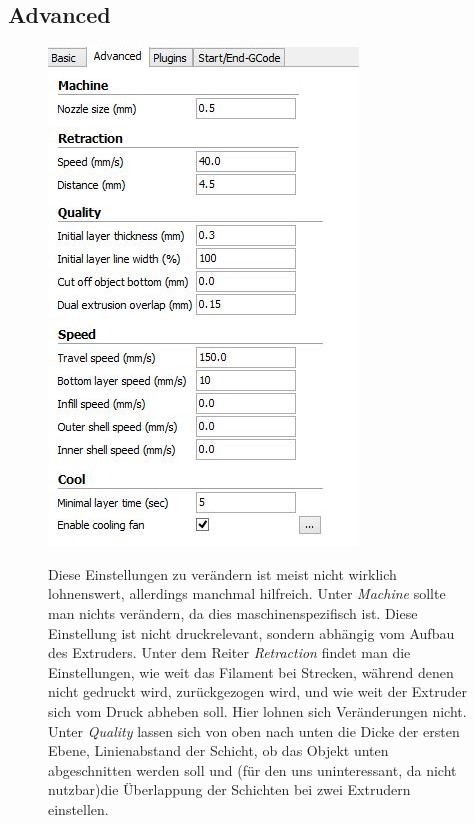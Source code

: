 \documentclass[11pt,a4paper]{scrartcl}
\begin{document}
\subsection{Advanced}
\begin{figure}[ht]
\begin{minipage}{.55\textwidth}
\begin{center}
 \includegraphics[scale=0.7]{res/CuraSettingAdvanced.JPG}
 \end{center}
\end{minipage}
\begin{minipage}{.47\textwidth}
Diese Einstellungen zu verändern ist meist nicht wirklich lohnenswert, allerdings manchmal hilfreich. Unter \textit{Machine} sollte man nichts verändern, da dies maschinenspezifisch ist. Diese Einstellung ist nicht druckrelevant, sondern abhängig vom Aufbau des Extruders. Unter dem Reiter \textit{Retraction} findet man die Einstellungen, wie weit das Filament bei Strecken, während denen nicht gedruckt wird, zurückgezogen wird, und wie weit der Extruder sich vom Druck abheben soll. Hier lohnen sich Veränderungen nicht.\\
Unter \textit{Quality} lassen sich von oben nach unten die Dicke der ersten Ebene, Linienabstand der Schicht, ob das Objekt unten abgeschnitten werden soll und (für den uns uninteressant, da nicht nutzbar)die Überlappung der Schichten bei zwei Extrudern einstellen.\\
\end{minipage}
\end{figure}
\end{document}
